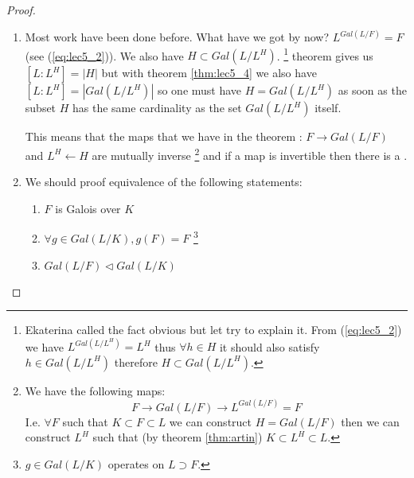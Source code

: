 \begin{theorem}
  \begin{proof}
    \begin{enumerate}
    \item Most work have been done before. What have we got by now?
      $L^{Gal\left(L/F\right)} = F$ (see (\ref{eq:lec5_2})). We also
      have $H \subset Gal\left(L/L^H\right)$.
      \footnote{
        Ekaterina called the fact obvious but let try to explain it.
        From (\ref{eq:lec5_2}) we have
        $L^{Gal\left(L/L^H\right)} = L^H$ thus
        $\forall h \in H$ it should also satisfy $h \in
        Gal\left(L/L^H\right)$ therefore $H \subset
        Gal\left(L/L^H\right)$. 
      }
       theorem gives us
      $\left[L:L^H\right] = \left|H\right|$ but with theorem
      \ref{thm:lec5_4} we also have
      $\left[L:L^H\right] = \left|Gal\left(L/L^H\right)\right|$ so one
      must have $H = Gal\left(L/L^H\right)$ as soon as the subset $H$
      has the same cardinality as the set $Gal\left(L/L^H\right)$ itself.

      This means that the maps that we have in the theorem :
      $F \rightarrow Gal\left(L/F\right)$ and
      $L^H \leftarrow H$ are mutually inverse
      \footnote{
        We have the following maps:
        \[
        F \to Gal\left(L/F\right) \to L^{Gal\left(L/F\right)} = F
        \]
        I.e. $\forall F$ such that $K \subset F \subset L$ we can
        construct $H = Gal\left(L/F\right)$ then we can construct
        $L^H$ such that (by theorem \ref{thm:artin})
        $K \subset L^H \subset L$.
      }
      and if a map is invertible then there is a .
    \item We should proof equivalence of the following statements:
      \begin{enumerate}
      \item $F$ is Galois over $K$ \label{item:galoiscorrespondence1}
      \item $\forall g \in Gal\left(L/K\right), g\left(F\right) = F$
        \label{item:galoiscorrespondence2}
        \footnote{
          $g \in Gal\left(L/K\right)$ operates on $L \supset F$.
        }
      \item $Gal\left(L/F\right) \triangleleft Gal\left(L/K\right)$
        \label{item:galoiscorrespondence3}
      \end{enumerate}      
    \end{enumerate}


\end{proof}
\end{theorem}
